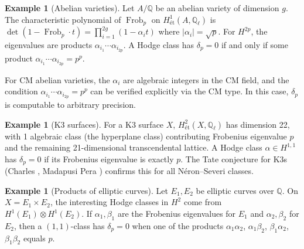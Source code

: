 \documentclass[11pt]{article}
\theoremstyle{definition}
\newtheorem{example}[theorem]{Example}
\DeclareMathOperator{\Frob}{Frob}
\begin{document}
\begin{example}[Abelian varieties]
\label{ex:abelian}
Let $A/\mathbb{Q}$ be an abelian variety of dimension $g$.  The
characteristic polynomial of $\Frob_p$ on
$H^1_{\text{\'et}}(A, \mathbb{Q}_\ell)$ is
$\det(1 - \Frob_p \cdot t) = \prod_{i=1}^{2g} (1 - \alpha_i t)$
where $|\alpha_i| = \sqrt{p}$.  For $H^{2p}$, the eigenvalues are
products $\alpha_{i_1} \cdots \alpha_{i_{2p}}$.  A Hodge class has
$\delta_p = 0$ if and only if some product
$\alpha_{i_1} \cdots \alpha_{i_{2p}} = p^p$.

For CM abelian varieties, the $\alpha_i$ are algebraic integers in the
CM field, and the condition $\alpha_{i_1} \cdots \alpha_{i_{2p}} = p^p$
can be verified explicitly via the CM type.  In this case, $\delta_p$
is computable to arbitrary precision.
\end{example}

\begin{example}[K3 surfaces]
\label{ex:k3}
For a K3 surface $X$, $H^2_{\text{\'et}}(X, \mathbb{Q}_\ell)$ has
dimension 22, with 1 algebraic class (the hyperplane class) contributing
Frobenius eigenvalue $p$ and the remaining 21-dimensional transcendental
lattice.  A Hodge class $\alpha \in H^{1,1}$ has $\delta_p = 0$ if its
Frobenius eigenvalue is exactly $p$.  The Tate conjecture for K3s
(Charles \cite{Charles}, Madapusi Pera \cite{MP}) confirms this for all
N\'eron--Severi classes.
\end{example}

\begin{example}[Products of elliptic curves]
\label{ex:product-curves}
Let $E_1, E_2$ be elliptic curves over $\mathbb{Q}$.
On $X = E_1 \times E_2$, the interesting Hodge classes in $H^2$ come
from $H^1(E_1) \otimes H^1(E_2)$.  If $\alpha_1, \beta_1$ are the
Frobenius eigenvalues for $E_1$ and $\alpha_2, \beta_2$ for $E_2$,
then a $(1,1)$-class has $\delta_p = 0$ when one of the products
$\alpha_1 \alpha_2$, $\alpha_1 \beta_2$, $\beta_1 \alpha_2$,
$\beta_1 \beta_2$ equals $p$.
\end{example}
\end{document}
